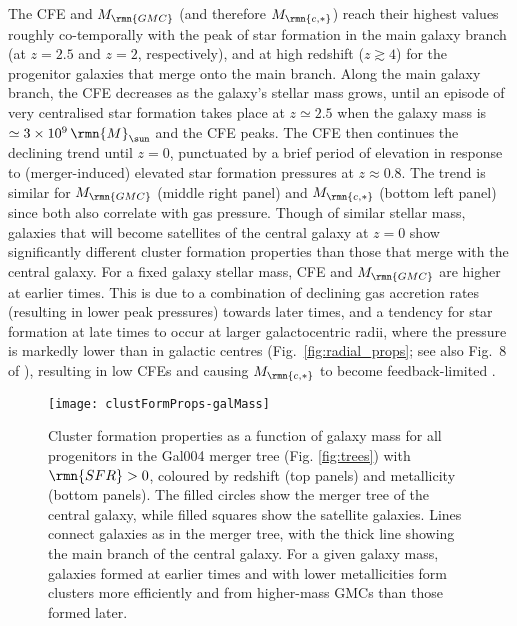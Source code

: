 \documentclass[fleqn,usenatbib]{mnras}
\newcommand\Msun{\,\rmn{M}_{\sun}}
\newcommand{\Mcstar}{M_\rmn{c,\ast}}
\newcommand{\Mgmc}{M_\rmn{GMC}}
\begin{document}
The CFE and $\Mgmc$ (and therefore $\Mcstar$) reach their highest values roughly co-temporally with the peak of star formation in the main galaxy branch (at $z=2.5$ and $z=2$, respectively), and at high redshift ($z \gtrsim 4$) for the progenitor galaxies that merge onto the main branch. Along the main galaxy branch, the CFE decreases as the galaxy's stellar mass grows, until an episode of very centralised star formation takes place at $z \simeq 2.5$ when the galaxy mass is $\simeq 3 \times 10^9 \Msun$ and the CFE peaks. The CFE then continues the declining trend until $z=0$, punctuated by a brief period of elevation in response to (merger-induced) elevated star formation pressures at $z \approx 0.8$. The trend is similar for $\Mgmc$ (middle right panel) and $\Mcstar$ (bottom left panel) since both also correlate with gas pressure. 
Though of similar stellar mass, galaxies that will become satellites of the central galaxy at $z=0$ show significantly different cluster formation properties than those that merge with the central galaxy.
For a fixed galaxy stellar mass, CFE and $\Mgmc$ are higher at earlier times. This is due to a combination of declining gas accretion rates (resulting in lower peak pressures) towards later times, and a tendency for star formation at late times to occur at larger galactocentric radii, where the pressure is markedly lower than in galactic centres (Fig.~\ref{fig:radial_props}; see also Fig.~8 of \citealt{C15}), resulting in low CFEs \citep[see Fig.~\ref{fig:CFE} and][]{Kruijssen_12} and causing $\Mcstar$ to become feedback-limited \citep{Reina-Campos_and_Kruijssen_17}.

\begin{figure*}
  \texttt{[image: clustFormProps-galMass]}
  \caption{Cluster formation properties as a function of galaxy mass for all progenitors in the Gal004 merger tree (Fig. \ref{fig:trees}) with $\rmn{SFR}>0$, coloured by redshift (top panels) and metallicity (bottom panels). The filled circles show the merger tree of the central galaxy, while filled squares show the satellite galaxies. Lines connect galaxies as in the merger tree, with the thick line showing the main branch of the central galaxy. For a given galaxy mass, galaxies formed at earlier times and with lower metallicities form clusters more efficiently and from higher-mass GMCs than those formed later.}
  \label{fig:CFE-galMass}
\end{figure*}
\end{document}
